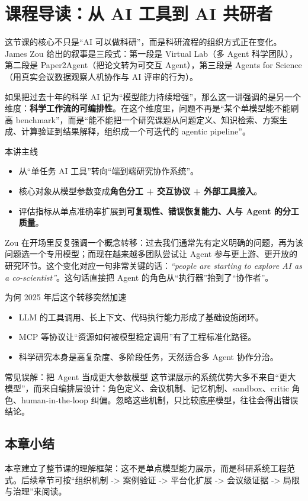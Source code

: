 \section{课程导读：从 AI 工具到 AI 共研者}

这节课的核心不只是``AI 可以做科研''，而是科研流程的组织方式正在变化。James Zou 给出的叙事是三段式：第一段是 Virtual Lab（多 Agent 科学团队），第二段是 Paper2Agent（把论文转为可交互 Agent），第三段是 Agents for Science（用真实会议数据观察人机协作与 AI 评审的行为）。

如果把过去十年的科学 AI 记为``模型能力持续增强''，那么这一讲强调的是另一个维度：\textbf{科学工作流的可编排性}。在这个维度里，问题不再是``某个单模型能不能刷高 benchmark''，而是``能不能把一个研究课题从问题定义、知识检索、方案生成、计算验证到结果解释，组织成一个可迭代的 agentic pipeline''。

\begin{importantbox}{本讲主线}
\begin{itemize}
    \item 从``单任务 AI 工具''转向``端到端研究协作系统''。
    \item 核心对象从模型参数变成\textbf{角色分工 + 交互协议 + 外部工具接入}。
    \item 评估指标从单点准确率扩展到\textbf{可复现性、错误恢复能力、人与 Agent 的分工质量}。
\end{itemize}
\end{importantbox}

Zou 在开场里反复强调一个概念转移：过去我们通常先有定义明确的问题，再为该问题选一个专用模型；而现在越来越多团队尝试让 Agent 参与更上游、更开放的研究环节。这个变化对应一句非常关键的话：\textit{``people are starting to explore AI as a co-scientist''}。这句话直接把 Agent 的角色从``执行器''抬到了``协作者''。

\begin{knowledgebox}{为何 2025 年后这个转移突然加速}
\begin{itemize}
    \item LLM 的工具调用、长上下文、代码执行能力形成了基础设施闭环。
    \item MCP 等协议让``资源如何被模型稳定调用''有了工程标准化路径。
    \item 科学研究本身是高复杂度、多阶段任务，天然适合多 Agent 协作分治。
\end{itemize}
\end{knowledgebox}

\begin{warningbox}{常见误解：把 Agent 当成更大参数模型}
这节课展示的系统优势大多不来自``更大模型''，而来自编排层设计：角色定义、会议机制、记忆机制、sandbox、critic 角色、human-in-the-loop 纠偏。忽略这些机制，只比较底座模型，往往会得出错误结论。
\end{warningbox}

\subsection{本章小结}

本章建立了整节课的理解框架：这不是单点模型能力展示，而是科研系统工程范式。后续章节可按``组织机制 -> 案例验证 -> 平台化扩展 -> 会议级证据 -> 局限与治理''来阅读。

